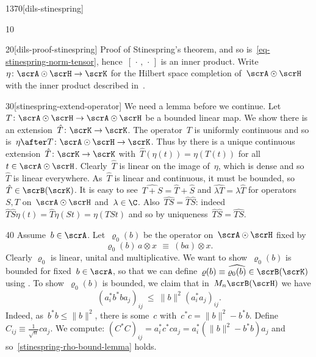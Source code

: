 \begin{parsec}{1370}[dils-stinespring]
\begin{point}{10}
\begin{point}{20}[dils-proof-stinespring]{%
    Proof of Stinespring's theorem, }
    and so is~\eqref{eq-stinespring-norm-tensor},
    hence~$[\,\cdot\,,\,\cdot\,]$ is an inner product.
Write~$\eta\colon \scrA\odot \scrH \to \scrK$ for the Hilbert space completion
    of~$\scrA \odot \scrH$ with the inner product
    described in~.
\begin{point}{30}[stinespring-extend-operator]%
We need a lemma before we continue.
Let~$T\colon \scrA \odot \scrH \to \scrA \odot \scrH$
be a bounded linear map.
We show there is an extension~$\hat{T} \colon \scrK \to \scrK$.
The operator~$T$ is
uniformly continuous and so is~$\eta\after T \colon \scrA\odot\scrH \to\scrK$.
Thus by 
there is a unique continuous extension~$\hat{T} \colon \scrK \to \scrK$
with~$\hat{T}(\eta(t)) = \eta(T(t))$
    for all~$t \in \scrA\odot\scrH$.
Clearly~$\hat{T}$ is linear on the image of~$\eta$,
    which is dense and so~$\hat{T}$ is linear everywhere.
As~$\hat{T}$ is linear and continuous, it must be
    bounded, so~$\hat{T} \in \scrB(\scrK)$.
It is easy to see~$\widehat{T+S}=\hat{T}+\hat{S}$ and
    $\widehat{\lambda T} = \lambda \hat{T}$
    for operators~$S,T$ on~$\scrA \odot \scrH$ and~$\lambda \in \C$.
Also~$\widehat{TS} = \hat{T}\hat{S}$:
indeed~$\hat{T}\hat{S} \eta(t)
            = \hat{T} \eta(St)
            = \eta(TSt)$
    and so by uniqueness~$\hat{T}\hat{S} = \widehat{TS}$.
\end{point}
\begin{point}{40}%
    Assume~$b\in \scrA$.
    Let~$\varrho_0(b)$ be the operator on~$\scrA \odot \scrH$
    fixed by
\begin{equation*}
    \varrho_0(b)\, a\otimes x\, \  \equiv\  (b a) \otimes x.
\end{equation*}
Clearly $\varrho_0$ is linear, unital and multiplicative.
We want to show~$\varrho_0(b)$ is bounded for fixed~$b \in \scrA$,
    so that we can define~$\varrho(b) \equiv \widehat{\varrho_0(b)}
            \in \scrB(\scrK)$ using .
    To show~$\varrho_0(b)$ is bounded, we claim that in~$M_n\scrB(\scrH)$
we have
\begin{equation}\label{stinespring-rho-bound-lemma}
(a_i^*b^*ba_j)_{ij} \ \leq\  \|b\|^2 (a_i^*a_j)_{ij}.
\end{equation}
Indeed, as~$b^*b \leq \|b\|^2$,
    there is some~$c$ with~$c^*c = \|b\|^2 - b^*b$.
Define~$C_{ij} \equiv \frac{1}{\sqrt{n}} ca_j$.
We compute:
$ (C^*C)_{ij} = a_i^*c^*ca_j = a_i^* (\|b\|^2 - b^*b) a_j$
and so~\eqref{stinespring-rho-bound-lemma} holds.

\end{point}
\end{point}
\end{point}
\end{parsec}

